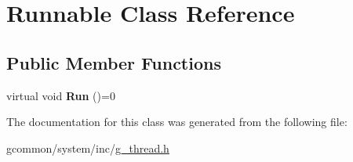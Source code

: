 \hypertarget{class_runnable}{\section{Runnable Class Reference}
\label{class_runnable}
}
\subsection*{Public Member Functions}
\begin{DoxyCompactItemize}
\item 
\hypertarget{class_runnable_a6d5fbd0e55c22d7c40dafa9d23de3ca4}{virtual void {\bfseries Run} ()=0}\label{class_runnable_a6d5fbd0e55c22d7c40dafa9d23de3ca4}

\end{DoxyCompactItemize}


The documentation for this class was generated from the following file\-:\begin{DoxyCompactItemize}
\item 
gcommon/system/inc/\hyperlink{g__thread_8h}{g\-\_\-thread.\-h}\end{DoxyCompactItemize}
